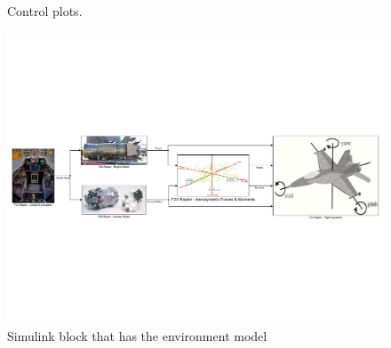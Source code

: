 \begin{figure}[h!]
	\centering
	\hfill
	\caption{Control plots.}
\end{figure}

\begin{figure}[thpb]
	\centering
	
	\includegraphics[trim={0 7.5cm 0 7.5cm},clip,width=\linewidth]{./fig/00_F22_Model_v2}
	
	\caption{Simulink block that has the environment model}
	\label{00F22Model} 
\end{figure}

